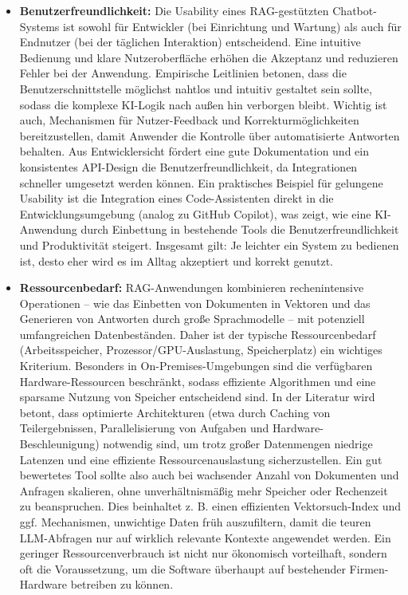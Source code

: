 \begin{itemize}
    \item \textbf{Benutzerfreundlichkeit:} Die Usability eines RAG-gestützten Chatbot-Systems ist sowohl für Entwickler (bei Einrichtung und Wartung) als auch für Endnutzer (bei der täglichen Interaktion) entscheidend. Eine intuitive Bedienung und klare Nutzeroberfläche erhöhen die Akzeptanz und reduzieren Fehler bei der Anwendung. Empirische Leitlinien betonen, dass die Benutzerschnittstelle möglichst nahtlos und intuitiv gestaltet sein sollte, sodass die komplexe KI-Logik nach außen hin verborgen bleibt. Wichtig ist auch, Mechanismen für Nutzer-Feedback und Korrekturmöglichkeiten bereitzustellen, damit Anwender die Kontrolle über automatisierte Antworten behalten. Aus Entwicklersicht fördert eine gute Dokumentation und ein konsistentes API-Design die Benutzerfreundlichkeit, da Integrationen schneller umgesetzt werden können. Ein praktisches Beispiel für gelungene Usability ist die Integration eines Code-Assistenten direkt in die Entwicklungsumgebung (analog zu GitHub Copilot), was zeigt, wie eine KI-Anwendung durch Einbettung in bestehende Tools die Benutzerfreundlichkeit und Produktivität steigert. Insgesamt gilt: Je leichter ein System zu bedienen ist, desto eher wird es im Alltag akzeptiert und korrekt genutzt.
    \item \textbf{Ressourcenbedarf:} RAG-Anwendungen kombinieren rechenintensive Operationen – wie das Einbetten von Dokumenten in Vektoren und das Generieren von Antworten durch große Sprachmodelle – mit potenziell umfangreichen Datenbeständen. Daher ist der typische Ressourcenbedarf (Arbeitsspeicher, Prozessor/GPU-Auslastung, Speicherplatz) ein wichtiges Kriterium. Besonders in On-Premises-Umgebungen sind die verfügbaren Hardware-Ressourcen beschränkt, sodass effiziente Algorithmen und eine sparsame Nutzung von Speicher entscheidend sind. In der Literatur wird betont, dass optimierte Architekturen (etwa durch Caching von Teilergebnissen, Parallelisierung von Aufgaben und Hardware-Beschleunigung) notwendig sind, um trotz großer Datenmengen niedrige Latenzen und eine effiziente Ressourcenauslastung sicherzustellen. Ein gut bewertetes Tool sollte also auch bei wachsender Anzahl von Dokumenten und Anfragen skalieren, ohne unverhältnismäßig mehr Speicher oder Rechenzeit zu beanspruchen. Dies beinhaltet z. B. einen effizienten Vektorsuch-Index und ggf. Mechanismen, unwichtige Daten früh auszufiltern, damit die teuren LLM-Abfragen nur auf wirklich relevante Kontexte angewendet werden. Ein geringer Ressourcenverbrauch ist nicht nur ökonomisch vorteilhaft, sondern oft die Voraussetzung, um die Software überhaupt auf bestehender Firmen-Hardware betreiben zu können.

\end{itemize}
